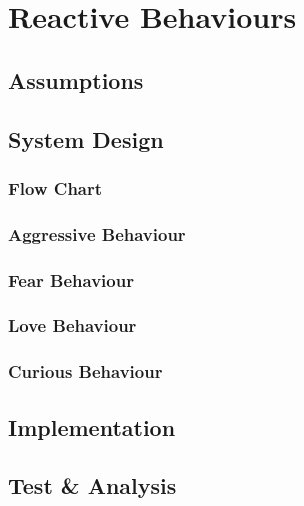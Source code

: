 \chapter{Reactive Behaviours}
\label{chap:reactive}

\section{Assumptions}

\section{System Design}

\subsection{Flow Chart}

\subsection{Aggressive Behaviour}

\subsection{Fear Behaviour}

\subsection{Love Behaviour}

\subsection{Curious Behaviour}




\section{Implementation}

\section{Test \& Analysis}